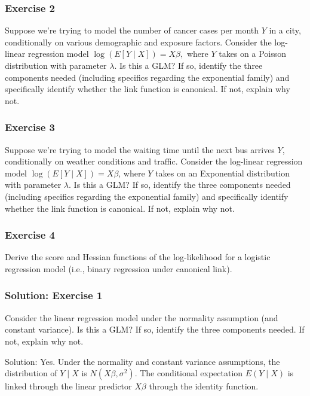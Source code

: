\documentclass{beamer}
\begin{document}
\begin{frame}
\frametitle{Exercise 2}

Suppose we’re trying to model the number of cancer cases per month $Y$ in a city, conditionally on various demographic and exposure factors. Consider the log-linear regression model $\log (E[Y \mid X]) = X\beta,$ where $Y$ takes on a Poisson distribution with parameter  $\lambda.$ Is this a GLM? If so, identify the three components needed (including specifics regarding the exponential family) and specifically identify whether the link function is canonical. If not, explain why not.
\end{frame}

\begin{frame}
\frametitle{Exercise 3}

Suppose we’re trying to model the waiting time until the next bus arrives $Y$, conditionally on weather conditions and traffic. Consider the log-linear regression model $\log (E[Y \mid X]) = X\beta$, where $Y$ takes on an Exponential distribution with parameter $\lambda$. Is this a GLM? If so, identify the three components needed (including specifics regarding the exponential family) and specifically identify whether the link function is canonical. If not, explain why not.

\end{frame}

\begin{frame}
\frametitle{Exercise 4}

Derive the score and Hessian functions of the log-likelihood for a logistic regression model (i.e., binary regression under canonical link).

\end{frame}

%
%

\begin{frame}
\frametitle{Solution: Exercise 1}

Consider the linear regression model under the normality assumption (and constant variance). Is this a GLM? If so, identify the three components needed. If not, explain why not.

\vspace*{1em}

Solution: Yes. Under the normality and constant variance assumptions, the distribution of $Y \mid X$ is $N(X\beta, \sigma^2).$ The conditional expectation $E(Y \mid X)$ is linked through the linear predictor $X\beta$ through the identity function. 
\end{frame}
\end{document}
